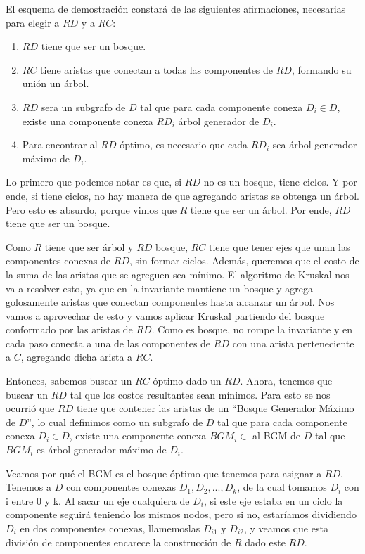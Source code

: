 El esquema de demostración constará de las siguientes afirmaciones, necesarias para elegir a $RD$ y a $RC$:

\begin{enumerate}
	\item $RD$ tiene que ser un bosque.

	\item $RC$ tiene aristas que conectan a todas las componentes de $RD$, formando su unión un árbol.

	\item $RD$ sera un subgrafo de $D$ tal que para cada componente conexa $D_i \in D$, existe una componente conexa $RD_i$ árbol generador de $D_i$.

	\item Para encontrar al $RD$ óptimo, es necesario que cada $RD_i$ sea árbol generador máximo de $D_i$.
\end{enumerate}

Lo primero que podemos notar es que, si $RD$ no es un bosque, tiene ciclos. Y por ende, si tiene ciclos, no hay manera de que agregando aristas se obtenga un árbol. Pero esto es absurdo, porque vimos que $R$ tiene que ser un árbol. Por ende, $RD$ tiene que ser un bosque. %

Como $R$ tiene que ser árbol y $RD$ bosque, $RC$ tiene que tener ejes que unan las componentes conexas de $RD$, sin formar ciclos. Además, queremos que el costo de la suma de las aristas que se agreguen sea mínimo. El algoritmo de Kruskal nos va a resolver esto, ya que en la invariante mantiene un bosque y agrega golosamente aristas que conectan componentes hasta alcanzar un árbol. Nos vamos a aprovechar de esto y vamos aplicar Kruskal partiendo del bosque conformado por las aristas de $RD$. Como es bosque, no rompe la invariante y en cada paso conecta a una de las componentes de $RD$ con una arista perteneciente a $C$, agregando dicha arista a $RC$. %

Entonces, sabemos buscar un $RC$ óptimo dado un $RD$. Ahora, tenemos que buscar un $RD$ tal que los costos resultantes sean mínimos. Para esto se nos ocurrió que $RD$ tiene que contener las aristas de un “Bosque Generador Máximo de $D$”, lo cual definimos como un subgrafo de $D$ tal que para cada componente conexa $D_i \in D$, existe una componente conexa $BGM_i \in$ al BGM de $D$ tal que $BGM_i$ es árbol generador máximo de $D_i$.

Veamos por qué el BGM es el bosque óptimo que tenemos para asignar a $RD$. Tenemos a $D$ con componentes conexas $D_1 , D_2 , ... , D_k$, de la cual tomamos $D_i$ con i entre 0 y k. Al sacar un eje cualquiera de $D_i$, si este eje estaba en un ciclo la componente seguirá teniendo los mismos nodos, pero si no, estaríamos dividiendo $D_i$ en dos componentes conexas, llamemoslas $D_{i1}$ y $D_{i2}$, y veamos que esta división de componentes encarece la construcción de $R$ dado este $RD$. 

